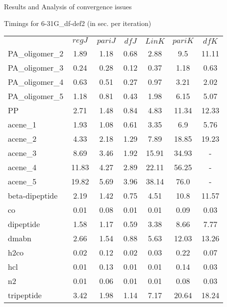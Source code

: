 \begin{frame}{Results and Analysis of convergence issues}
\footnotesize

\begin{center}
Timings for 6-31G\_df-def2 (in sec. per iteration)
\begin{tabular}{lcccccc}
\hline
& $regJ$ & $pariJ$ & $dfJ$ & $LinK$ & $pariK$ & $dfK$ \\ 
PA\_oligomer\_2 & 1.89 & 1.18 & 0.68 & 2.88 & 9.5 & 11.11 \\ 
PA\_oligomer\_3 & 0.24 & 0.28 & 0.12 & 0.37 & 1.18 & 0.63 \\ 
PA\_oligomer\_4 & 0.63 & 0.51 & 0.27 & 0.97 & 3.21 & 2.02 \\ 
PA\_oligomer\_5 & 1.18 & 0.81 & 0.43 & 1.98 & 6.15 & 5.07 \\ 
PP & 2.71 & 1.48 & 0.84 & 4.83 & 11.34 & 12.33 \\ 
acene\_1 & 1.93 & 1.08 & 0.61 & 3.35 & 6.9 & 5.76 \\ 
acene\_2 & 4.33 & 2.18 & 1.29 & 7.89 & 18.85 & 19.23 \\ 
acene\_3 & 8.69 & 3.46 & 1.92 & 15.91 & 34.93 & - \\ 
acene\_4 & 11.83 & 4.27 & 2.89 & 22.11 & 56.25 & - \\ 
acene\_5 & 19.82 & 5.69 & 3.96 & 38.14 & 76.0 & - \\ 
beta-dipeptide & 2.19 & 1.42 & 0.75 & 4.51 & 10.8 & 11.57 \\ 
co & 0.01 & 0.08 & 0.01 & 0.01 & 0.09 & 0.03 \\ 
dipeptide & 1.58 & 1.17 & 0.59 & 3.38 & 8.66 & 7.77 \\ 
dmabn & 2.66 & 1.54 & 0.88 & 5.63 & 12.03 & 13.26 \\ 
h2co & 0.02 & 0.12 & 0.02 & 0.03 & 0.22 & 0.07 \\ 
hcl & 0.01 & 0.13 & 0.01 & 0.01 & 0.14 & 0.03 \\ 
n2 & 0.01 & 0.06 & 0.01 & 0.01 & 0.08 & 0.03 \\ 
tripeptide & 3.42 & 1.98 & 1.14 & 7.17 & 20.64 & 18.24 \\ 
\hline
\end{tabular}
\end{center}

\end{frame}



